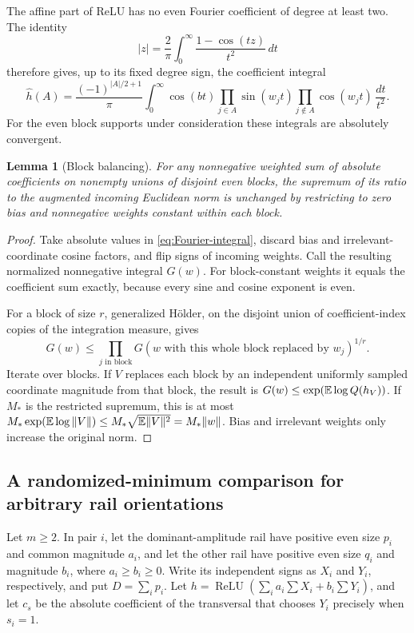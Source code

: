 \documentclass[11pt]{article}
\newtheorem{lemma}[theorem]{Lemma}
\theoremstyle{remark}\newtheorem{remark}[theorem]{Remark}
\begin{document}
The affine part of ReLU has no even Fourier coefficient of degree at least
two. The identity
\[
 |z|=\frac2\pi\int_0^\infty\frac{1-\cos(tz)}{t^2}\,dt
\]
therefore gives, up to its fixed degree sign, the coefficient integral
\begin{equation}\label{eq:Fourier-integral}
 \widehat h(A)=\frac{(-1)^{|A|/2+1}}\pi
 \int_0^\infty\cos(bt)
 \prod_{j\in A}\sin(w_jt)\prod_{j\notin A}\cos(w_jt)\,\frac{dt}{t^2}.
\end{equation}
For the even block supports under consideration these integrals are
absolutely convergent.

\begin{lemma}[Block balancing]\label{lem:balancing}
For any nonnegative weighted sum of absolute coefficients on nonempty
unions of disjoint even blocks, the supremum of its ratio to the augmented
incoming Euclidean norm is unchanged by restricting to zero bias and
nonnegative weights constant within each block.
\end{lemma}
\begin{proof}
Take absolute values in \eqref{eq:Fourier-integral}, discard bias and
irrelevant-coordinate cosine factors, and flip signs of incoming weights.
Call the resulting normalized nonnegative integral $G(w)$. For block-constant
weights it equals the coefficient sum exactly, because every sine and
cosine exponent is even.

For a block of size $r$, generalized H\"older, on the disjoint union of
coefficient-index copies of the integration measure, gives
\[
 G(w)\le\prod_{j\text{ in block}}
 G(w\text{ with this whole block replaced by }w_j)^{1/r}.
\]
Iterate over blocks. If $V$ replaces each block by an independent uniformly
sampled coordinate magnitude from that block, the result is
$G(w)\le\exp(\mathbb E\log Q(h_V))$. If $M_*$ is the restricted supremum,
this is at most
$M_*\exp(\mathbb E\log\|V\|)\le M_*\sqrt{\mathbb E\|V\|^2}=M_*\|w\|$.
Bias and irrelevant weights only increase the original norm.
\end{proof}

\subsection{A randomized-minimum comparison for arbitrary rail orientations}

Let $m\ge2$. In pair $i$, let the dominant-amplitude rail have positive
even size $p_i$ and common magnitude $a_i$, and let the other rail have
positive even size $q_i$ and magnitude $b_i$, where $a_i\ge b_i\ge0$.
Write its independent signs as $X_i$ and $Y_i$, respectively, and put
$D=\sum_i p_i$. Let $h=\operatorname{ReLU}(\sum_i a_i\sum X_i+
b_i\sum Y_i)$, and let $c_s$ be the absolute coefficient of the
transversal that chooses $Y_i$ precisely when $s_i=1$.
\end{document}
